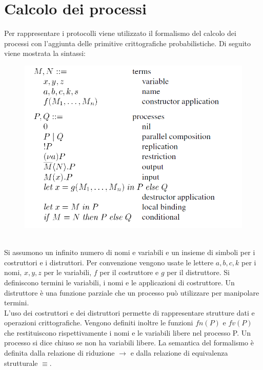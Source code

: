 \documentclass[12pt]{article}
\begin{document}
\section*{Calcolo dei processi}
Per rappresentare i protocolli viene utilizzato il formalismo del calcolo dei processi con l'aggiunta delle primitive crittografiche probabilistiche. Di seguito viene mostrata la sintassi:\\
\begin{figure}[h]
    \centering
    \includegraphics[scale=0.6]{Relazione/Immagini/calcolo.PNG}
\end{figure}\\
Si assumono un infinito numero di nomi e variabili e un insieme di simboli per i costruttori e i distruttori. Per convenzione vengono usate le lettere $a, b, c, k$ per i nomi, $x, y, z$ per le variabili, $f$ per il costruttore e $g$ per il distruttore. Si definiscono termini le variabili, i nomi e le applicazioni di costruttore. Un distruttore è una funzione parziale che un processo può utilizzare per manipolare termini.\\
L'uso dei costruttori e dei distruttori permette di rappresentare strutture dati e operazioni crittografiche. Vengono definiti inoltre le funzioni $fn(P)$ e $fv(P)$ che restituiscono rispettivamente i nomi e le variabili libere nel processo P. Un processo si dice chiuso se non ha variabili libere. La semantica del formalismo è definita dalla relazione di riduzione $ \xrightarrow{} $ e dalla relazione di equivalenza strutturale $ \equiv$.
\end{document}

